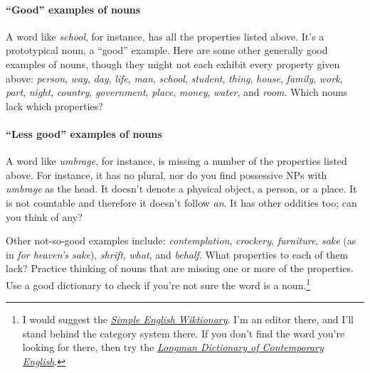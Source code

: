 \paragraph*{``Good'' examples of nouns}
A word like \textit{school}, for instance, has all the properties listed above. It's a prototypical noun, a ``good'' example. Here are some other generally good examples of nouns, though they might not each exhibit every property given above: \textit{person}, \textit{way}, \textit{day}, \textit{life}, \textit{man}, \textit{school}, \textit{student}, \textit{thing}, \textit{house}, \textit{family}, \textit{work}, \textit{part}, \textit{night}, \textit{country}, \textit{government}, \textit{place}, \textit{money}, \textit{water}, and \textit{room}. Which nouns lack which properties?

\paragraph*{``Less good'' examples of nouns}
A word like \textit{umbrage}, for instance, is missing a number of the properties listed above. For instance, it has no plural, nor do you find possessive NPs with \textit{umbrage} as the head. It doesn't denote a physical object, a person, or a place. It is not countable and therefore it doesn't follow \textit{an}. It has other oddities too; can you think of any?

Other not-so-good examples include: \textit{contemplation}, \textit{crockery}, \textit{furniture}, \textit{sake} (as in \textit{for heaven's sake}), \textit{shrift}, \textit{what}, and \textit{behalf}. What properties to each of them lack? Practice thinking of nouns that are missing one or more of the properties. Use a good dictionary to check if you're not sure the word is a noun.\footnote{I would suggest the \href{https://simple.wiktionary.org/wiki/Main_Page}{\textit{Simple English Wiktionary}}. I'm an editor there, and I'll stand behind the category system there. If you don't find the word you're looking for there, then try the \href{https://www.ldoceonline.com/}{\textit{Longman Dictionary of Contemporary English}}.}


